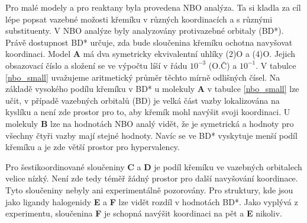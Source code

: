 \documentclass[
digital, %
table,   %
lof,     %
lot,     %
oneside,
]{fithesis3}
\begin{document}
Pro malé modely a pro reaktany byla provedena NBO analýza. Ta si kladla za cíl lépe popsat vazebné možosti křemíku v různých koordinacích a s různými substituenty. V NBO analýze byly analyzovány protivazebné orbitaly (BD*). Právě dostupnost BD* určuje, zda bude sloučenina křemíku ochotna navyšovat koordinaci. Model \textbf{A} má dva symetricky ekvivalentní uhlíky (2)O a (4)O. Jejich obsazovací číslo a složení se ve výpočtu líší v řádu $10^{-3}$ (O.Č) a $10^{-1}$. V tabulce \ref{nbo_small} uvažujeme aritmetický průměr těchto mírně odlišných čísel. Na základě vysokého podílu křemíku v BD* u molekuly \textbf{A} v tabulce \ref{nbo_small} lze učit, v případě vazebných orbitalů (BD) je velká část vazby lokalizována na kyslíku a není zde prostor pro to, aby křemík mohl navýšit svoji koordinaci. U molekuly \textbf{B} lze na hodnotách NBO analý vidět, že je symetrická a hodnoty pro všechny čtyři vazby mají stejné hodnoty. Navíc se ve BD* vyskytuje menší podíl křemíku a je zde větší prostor pro hypervalency.

Pro šestikoordinované sloučeniny \textbf{C} a  \textbf{D} je podíl křemíku ve vazebných orbitalech velice nízký. Není zde tedy téměř žádný prostor pro další navyšování koordinace. Tyto sloučeniny nebyly ani experimentálně pozorovány. Pro struktury, kde jsou jako ligandy halogenidy  \textbf{E} a  \textbf{F} lze vidět rozdíl v hodnotách BD*. Jako vyplývá z experimentu, sloučenina \textbf{F} je schopná navýšit koordinaci na pět a \textbf{E} nikoliv.
\end{document}

